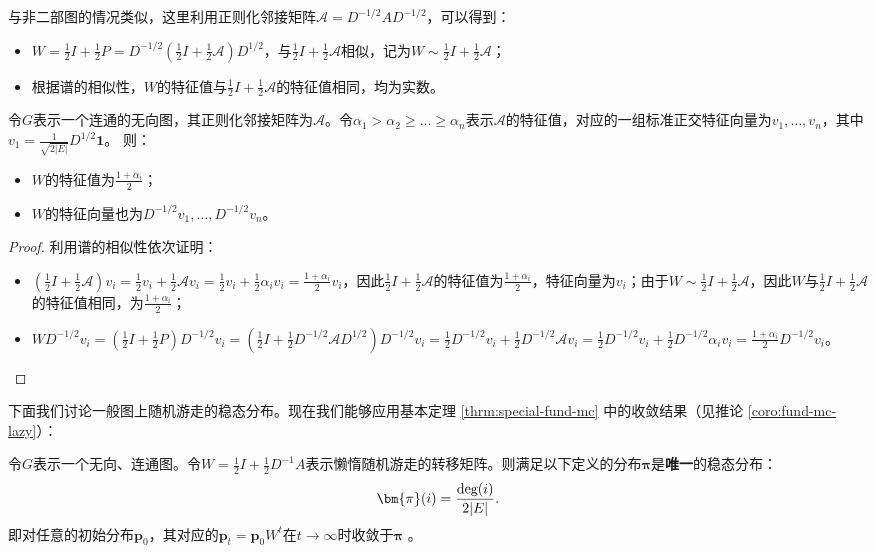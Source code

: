 \documentclass[lang=cn,newtx,10pt,scheme=chinese,chinesefont=nofont,citestyle=gb7714-2015, bibstyle=gb7714-2015]{elegantbook}
\begin{document}
\begin{refsection}
与非二部图的情况类似，这里利用正则化邻接矩阵$\mathcal{A}=D^{-1/2}AD^{-1/2}$，可以得到：
\begin{itemize}
    \item $W=\frac{1}{2}I+\frac{1}{2}P=D^{-1/2}(\frac{1}{2}I+\frac{1}{2}\mathcal{A})D^{1/2}$，与$\frac{1}{2}I+\frac{1}{2}\mathcal{A}$相似，记为$W\sim \frac{1}{2}I+\frac{1}{2}\mathcal{A}$；
    \item 根据谱的相似性，$W$的特征值与$\frac{1}{2}I+\frac{1}{2}\mathcal{A}$的特征值相同，均为实数。
\end{itemize}

\begin{lemma}
    \label{lemma:s-s-general}
    令$G$表示一个连通的无向图，其正则化邻接矩阵为$\mathcal{A}$。令$\alpha_1>\alpha_2\ge \dots\ge \alpha_n$表示$\mathcal{A}$的特征值，对应的一组标准正交特征向量为$v_1,\dots,v_n$，其中$v_1=\frac{1}{\sqrt{2|E|}}D^{1/2}\bm{1}$。
    则：
    \begin{itemize}
        \item $W$的特征值为$\frac{1+\alpha_i}{2}$；
        \item $W$的特征向量也为$D^{-1/2}v_1,\dots,D^{-1/2}v_n$。
    \end{itemize}
\end{lemma}

\begin{proof}
    利用谱的相似性依次证明：
    \begin{itemize}
        \item $(\frac{1}{2}I+\frac{1}{2}\mathcal{A})v_i=\frac{1}{2}v_i+\frac{1}{2}\mathcal{A}v_i=\frac{1}{2}v_i+\frac{1}{2}\alpha_iv_i=\frac{1+\alpha_i}{2}v_i$，因此$\frac{1}{2}I+\frac{1}{2}\mathcal{A}$的特征值为$\frac{1+\alpha_i}{2}$，特征向量为$v_i$；由于$W\sim \frac{1}{2}I+\frac{1}{2}\mathcal{A}$，因此$W$与$\frac{1}{2}I+\frac{1}{2}\mathcal{A}$的特征值相同，为$\frac{1+\alpha_i}{2}$；
        \item $WD^{-1/2}v_i=(\frac{1}{2}I+\frac{1}{2}P)D^{-1/2}v_i=(\frac{1}{2}I+\frac{1}{2}D^{-1/2}\mathcal{A}D^{1/2})D^{-1/2}v_i=\frac{1}{2}D^{-1/2}v_i+\frac{1}{2}D^{-1/2}\mathcal{A}v_i=\frac{1}{2}D^{-1/2}v_i+\frac{1}{2}D^{-1/2}\alpha_iv_i=\frac{1+\alpha_i}{2}D^{-1/2}v_i$。
    \end{itemize}
\end{proof}

下面我们讨论一般图上随机游走的稳态分布。现在我们能够应用基本定理 \ref{thrm:special-fund-mc} 中的收敛结果（见推论 \ref{coro:fund-mc-lazy}）：

\begin{corollary}
    \label{coro:fund-mc-lazy}
    令$G$表示一个无向、连通图。令$W=\frac{1}{2}I+\frac{1}{2}D^{-1}A$表示懒惰随机游走的转移矩阵。则满足以下定义的分布$\bm{\pi}$是\textbf{唯一}的稳态分布：
    \[
        \bm{\pi}(i)=\frac{\textup{deg}(i)}{2|E|}.
    \]
    即对任意的初始分布$\bm{p}_0$，其对应的$\bm{p}_t=\bm{p}_0W^t$在$t\to \infty$时收敛于$\bm{\pi}$%
    。
\end{corollary}


\end{refsection}
\end{document}
